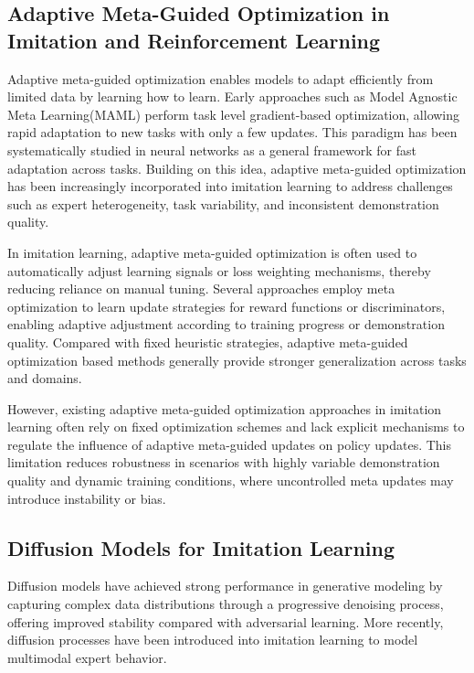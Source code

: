 \documentclass[journal]{IEEEtran}
\begin{document}
\subsection{Adaptive Meta-Guided Optimization in Imitation and Reinforcement Learning}
Adaptive meta-guided optimization enables models to adapt efficiently from limited data by learning how to learn. Early approaches such as Model Agnostic Meta Learning(MAML)\cite{finn2017model} perform task level gradient-based optimization, allowing rapid adaptation to new tasks with only a few updates. This paradigm has been systematically studied in neural networks as a general framework for fast adaptation across tasks\cite{hospedales2021meta}. Building on this idea, adaptive meta-guided optimization has been increasingly incorporated into imitation learning to address challenges such as expert heterogeneity, task variability, and inconsistent demonstration quality.

In imitation learning, adaptive meta-guided optimization is often used to automatically adjust learning signals or loss weighting mechanisms, thereby reducing reliance on manual tuning. Several approaches employ meta optimization to learn update strategies for reward functions or discriminators, enabling adaptive adjustment according to training progress or demonstration quality. Compared with fixed heuristic strategies, adaptive meta-guided optimization based methods generally provide stronger generalization across tasks and domains.

However, existing adaptive meta-guided optimization approaches in imitation learning often rely on fixed optimization schemes and lack explicit mechanisms to regulate the influence of adaptive meta-guided updates on policy updates. This limitation reduces robustness in scenarios with highly variable demonstration quality and dynamic training conditions, where uncontrolled meta updates may introduce instability or bias.


\subsection{Diffusion Models for Imitation Learning}
Diffusion models have achieved strong performance in generative modeling by capturing complex data distributions through a progressive denoising process, offering improved stability compared with adversarial learning\cite{ho2020denoising}. More recently, diffusion processes have been introduced into imitation learning to model multimodal expert behavior\cite{finn2017model}.
\end{document}
